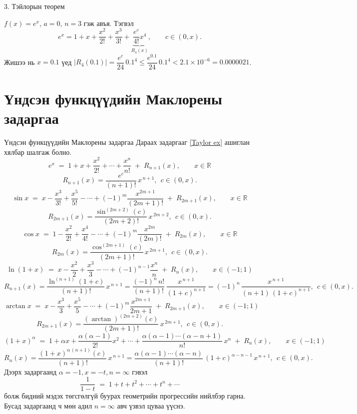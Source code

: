 \begin{frame}[allowframebreaks]{3. Тэйлорын теорем}
\begin{example}
$f(x)=e^x$, $a=0$, $n=3$ гэж авъя. Тэгвэл
\[
e^x=1+x+\frac{x^2}{2!}+\frac{x^3}{3!}+\underbrace{\frac{e^c}{4!}x^4}_{R_4(x)},\qquad c\in(0,x).
\]
Жишээ нь $x=0.1$ үед $|R_4(0.1)|=\dfrac{e^{c}}{24}\,0.1^4\le \dfrac{e^{0.1}}{24}\,0.1^4<2.1\times 10^{-6}=0.0000021$.
\end{example}
\end{frame}

\section{Үндсэн функцүүдийн Маклорены задаргаа}
\begin{frame}[allowframebreaks]{Үндсэн функцүүдийн Маклорены задаргаа}
Дараах задаргааг \ref{Taylor ex} ашиглан хялбар шалгаж болно.
\[
e^x \;=\; 1 + x + \frac{x^2}{2!} + \cdots + \frac{x^n}{n!} \;+\; R_{n+1}(x), 
\qquad x\in\mathbb{R}\]
\[R_{n+1}(x)=\frac{e^{c}}{(n+1)!}\,x^{\,n+1},\ \ c\in(0,x).
\]
\[
\sin x \;=\; x - \frac{x^3}{3!} + \frac{x^5}{5!} - \cdots + 
(-1)^{m}\frac{x^{2m+1}}{(2m+1)!} \;+\; R_{2m+1}(x), \qquad x\in\mathbb{R}
\]
\[
R_{2m+1}(x)=\frac{\sin^{(2m+2)}(c)}{(2m+2)!}\,x^{\,2m+2},\ \ c\in(0,x).
\]
\[
\cos x \;=\; 1 - \frac{x^2}{2!} + \frac{x^4}{4!} - \cdots + 
(-1)^{m}\frac{x^{2m}}{(2m)!} \;+\; R_{2m}(x), \qquad x\in\mathbb{R}
\]
\[
R_{2m}(x)=\frac{\cos^{(2m+1)}(c)}{(2m+1)!}\,x^{\,2m+1},\ \ c\in(0,x).
\]
\[
\ln(1+x) \;=\; x - \frac{x^2}{2} + \frac{x^3}{3} - \cdots + 
(-1)^{n-1}\frac{x^{n}}{n} \;+\; R_{n}(x), \qquad x\in(-1;1)
\]
\[
R_{n+1}(x)=\frac{\ln^{(n+1)}(1+c)}{(n+1)!}\,x^{\,n+1}
=\frac{(-1)^{n}\,n!}{(n+1)!}\,\frac{x^{\,n+1}}{(1+c)^{n+1}}
= (-1)^{n}\,\frac{x^{\,n+1}}{(n+1)\,(1+c)^{n+1}},\ \ c\in(0,x).
\]
\[
\arctan x \;=\; x - \frac{x^3}{3} + \frac{x^5}{5} - \cdots + 
(-1)^{m}\frac{x^{2m+1}}{2m+1} \;+\; R_{2m+1}(x), \qquad x\in(-1;1)
\]
\[
R_{2m+1}(x)=\frac{(\arctan)^{(2m+2)}(c)}{(2m+1)!}\,x^{\,2m+1},\ \ c\in(0,x).
\]
\[
(1+x)^{\alpha} \;=\; 1 + \alpha x + \frac{\alpha(\alpha-1)}{2!}x^2 + \cdots +
\frac{\alpha(\alpha-1)\cdots(\alpha-n+1)}{n!}\,x^n \;+\; R_{n}(x), \qquad x\in(-1;1)
\]
\[
R_{n}(x)=\frac{(1+x)^{\alpha\,(n+1)}(c)}{(n+1)!}\,x^{\,n+1}
=\frac{\alpha(\alpha-1)\cdots(\alpha-n)}{(n+1)!}\,(1+c)^{\alpha-n-1}\,x^{\,n+1},\ \ c\in(0,x).
\]
Дээрх задаргаанд $\alpha=-1, x=-t, n=\infty$ гэвэл 
\[
\frac{1}{1-t} \;=\; 1 + t + t^2 + \cdots + t^n +\cdots 
\]
болж бидний мэдэх төгсгөлгүй буурах геометрийн прогрессийн нийлбэр гарна. Бусад задаргаанд ч мөн адил $n=\infty$ авч үзвэл цуваа үүснэ.
\end{frame}

